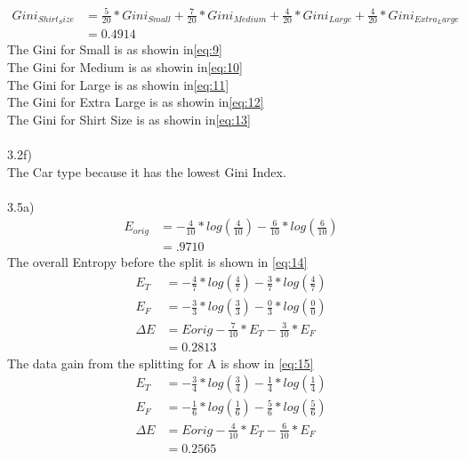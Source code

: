 \documentclass[12pt,english]{article}
\begin{document}
\begin{equation}\tag{5}\label{eq:13}
\begin{split}
Gini_{Shirt_Size} &= \frac{5}{20}*Gini_{Small} + \frac{7}{20}*Gini_{Medium} + \frac{4}{20}*Gini_{Large} + \frac{4}{20}*Gini_{Extra_Large}\\
&=0.4914
\end{split}
\end{equation}
The Gini for Small is as showin in\eqref{eq:9}\\
The Gini for Medium is as showin in\eqref{eq:10}\\
The Gini for Large is as showin in\eqref{eq:11}\\
The Gini for Extra Large is as showin in\eqref{eq:12}\\
The Gini for Shirt Size is as showin in\eqref{eq:13}\\ \\
3.2f)\\
The Car type because it has the lowest Gini Index.\\\\
3.5a)\\
\begin{equation}\tag{1}\label{eq:14}
\begin{split}
E_{orig} &= - \frac{4}{10} *log(\frac{4}{10}) - \frac{6}{10} *log(\frac{6}{10})\\
&=.9710
\end{split}
\end{equation}
The  overall Entropy before the split is shown in \eqref{eq:14}\\
\begin{equation}\tag{2}\label{eq:15}
\begin{split}
E_{T} &= - \frac{4}{7} *log(\frac{4}{7}) - \frac{3}{7} *log(\frac{4}{7})\\
E_{F} &= - \frac{3}{3} *log(\frac{3}{3}) - \frac{0}{3} *log(\frac{0}{0})\\
\Delta E &=E{orig} - \frac{7}{10} * E_{T} - \frac{3}{10} * E_{F}\\
 &=0.2813
\end{split}
\end{equation}
The data gain from the splitting for A is show in \eqref{eq:15}\\
\begin{equation}\tag{3}\label{eq:16}
\begin{split}
E_{T} &= - \frac{3}{4} *log(\frac{3}{4}) - \frac{1}{4} *log(\frac{1}{4})\\
E_{F} &= - \frac{1}{6} *log(\frac{1}{6}) - \frac{5}{6} *log(\frac{5}{6})\\
\Delta E &=E{orig} - \frac{4}{10} * E_{T} - \frac{6}{10} * E_{F}\\
 &=0.2565
\end{split}
\end{equation}
\end{document}
